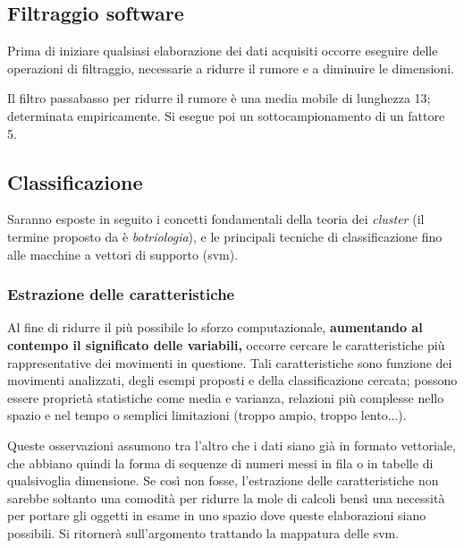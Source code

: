 
\subsection{Filtraggio software}
\label{ssez:filtraggio}

Prima di iniziare qualsiasi elaborazione dei dati acquisiti
occorre eseguire delle operazioni di filtraggio,
necessarie a ridurre il rumore e
a diminuire le dimensioni.

Il filtro passabasso per ridurre il rumore è
una media mobile di lunghezza 13;
determinata empiricamente.
Si esegue poi un sottocampionamento di un fattore 5.





\subsection{Classificazione}
\label{ssez:classificazione}

Saranno esposte in seguito i concetti fondamentali
della teoria dei \textit{cluster}
(il termine proposto da \cite{cit:fuzzy} è \textit{botriologia}\footnotemark{}),
e le principali tecniche di classificazione
fino alle macchine a vettori di supporto (\ac{svm}).


\subsubsection{Estrazione delle caratteristiche}
\label{sssez:estrazione}

Al fine di ridurre il più possibile lo sforzo computazionale,
\textbf{aumentando al contempo il significato delle variabili,}
occorre cercare le caratteristiche più rappresentative
dei movimenti in questione.
Tali caratteristiche sono funzione dei movimenti analizzati,
degli esempi proposti e
della classificazione cercata;
possono essere proprietà statistiche come media e varianza,
relazioni più complesse nello spazio e nel tempo
o semplici limitazioni (troppo ampio, troppo lento...).

Queste osservazioni assumono tra l'altro che i dati
siano già in formato vettoriale,
che abbiano quindi la forma di sequenze di numeri
messi in fila o in tabelle di qualsivoglia dimensione.
Se così non fosse, l'estrazione delle caratteristiche
non sarebbe soltanto una comodità per ridurre la mole di calcoli
bensì una necessità per portare gli oggetti in esame
in uno spazio dove queste elaborazioni siano possibili.
Si ritornerà sull'argomento trattando
la mappatura delle \ac{svm}.


